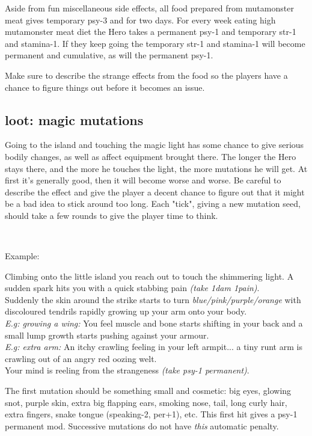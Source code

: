 Aside from fun miscellaneous side effects, all food prepared from mutamonster meat gives temporary psy-3 and for two days. For every week eating high mutamonster meat diet the Hero takes a permanent psy-1 and temporary str-1 and stamina-1. If they keep going the temporary str-1 and stamina-1 will become permanent and cumulative, as will the permanent psy-1.

Make sure to describe the strange effects from the food so the players have a chance to figure things out before it becomes an issue.


\subsection*{loot: magic mutations}
Going to the island and touching the magic light has some chance to give serious bodily changes, as well as affect equipment brought there. The longer the Hero stays there, and the more he touches the light, the more mutations he will get. At first it's generally good, then it will become worse and worse. Be careful to describe the effect and give the player a decent chance to figure out that it might be a bad idea to stick around too long. Each "tick", giving a new mutation seed, should take a few rounds to give the player time to think.

\

Example:
\begin{readoutloud}
Climbing onto the little island you reach out to touch the shimmering light. A sudden spark hits you with a quick stabbing pain \emph{(take 1dam 1pain)}.\\
Suddenly the skin around the strike starts to turn \emph{blue/pink/purple/orange} with discoloured tendrils rapidly growing up your arm onto your body.\\
\emph{E.g: growing a wing:} You feel muscle and bone starts shifting in your back and a small lump growth starts pushing against your armour.\\
\emph{E.g: extra arm:} An itchy crawling feeling in your left armpit... a tiny runt arm is crawling out of an angry red oozing welt.\\
Your mind is reeling from the strangeness \emph{(take psy-1 permanent)}.
\end{readoutloud}

The first mutation should be something small and cosmetic: big eyes, glowing snot, purple skin, extra big flapping ears, smoking nose, tail, long curly hair, extra fingers, snake tongue (speaking-2, per+1), etc. This first hit gives a psy-1 permanent mod. Successive mutations do not have \emph{this} automatic penalty.

